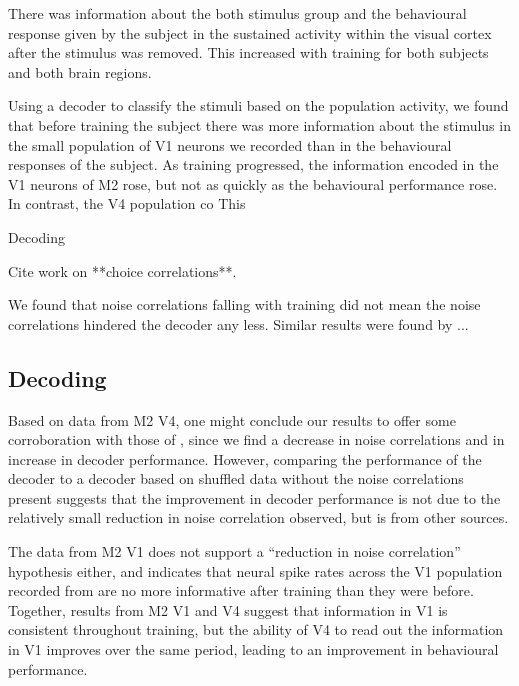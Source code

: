 There was information about the both stimulus group and the behavioural response given by the subject in the sustained activity within the visual cortex after the stimulus was removed.
This increased with training for both subjects and both brain regions.

Using a decoder to classify the stimuli based on the population activity, we found that before training the subject there was more information about the stimulus in the small population of \ac{V1} neurons we recorded than in the behavioural responses of the subject.
As training progressed, the information encoded in the \ac{V1} neurons of \ac{M2} rose, but not as quickly as the behavioural performance rose.
In contrast, the \ac{V4} population co
This 

Decoding

Cite work on **choice correlations**.

We found that noise correlations falling with training did not mean the noise correlations hindered the decoder any less.
Similar results were found by \citet{Gu2011}...

\subsection{Decoding}

Based on data from \ac{M2} \ac{V4}, one might conclude our results to offer some corroboration with those of \citet{Gu2011}, since we find a decrease in noise correlations and in increase in decoder performance.
However, comparing the performance of the decoder to a decoder based on shuffled data without the noise correlations present suggests that the improvement in decoder performance is not due to the relatively small reduction in noise correlation observed, but is from other sources.

The data from \ac{M2} \ac{V1} does not support a ``reduction in noise correlation'' hypothesis either, and indicates that neural spike rates across the \ac{V1} population recorded from are no more informative after training than they were before.
Together, results from \ac{M2} \ac{V1} and \ac{V4} suggest that information in \ac{V1} is consistent throughout training, but the ability of \ac{V4} to read out the information in \ac{V1} improves over the same period, leading to an improvement in behavioural performance.

